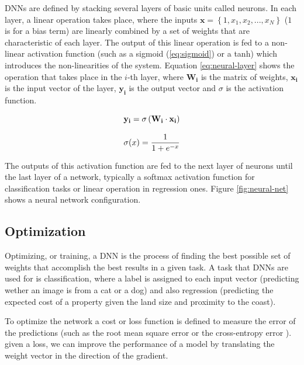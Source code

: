 DNNs are defined by stacking several layers of basic units called neurons. In each layer, a linear operation takes place, where the inputs $\mathbf{x}= \left \{ 1, x_1, x_2, ..., x_N \right \}$ ($1$ is for a bias term) are linearly combined by a set of weights that are characteristic of each layer. The output of this linear operation is fed to a non-linear activation function (such as a sigmoid (\eqref{eq:sigmoid}) or a tanh) which introduces the non-linearities of the system. Equation \eqref{eq:neural-layer} shows the operation that takes place in the $i$-th layer, where $\mathbf{W_i}$  is the matrix of weights, $\mathbf{x_i}$ is the input vector of the layer, $\mathbf{y_i}$ is the output vector and $\sigma$ is the activation function.

\begin{equation}
    \centering
    \mathbf{y_i} = \sigma \left ( \mathbf{W_i} \cdot \mathbf{x_i} \right )
    \label{eq:neural-layer}
\end{equation}

\begin{equation}
    \centering
    \sigma (x) = \frac{1}{1 + e^{-x}} 
    \label{eq:sigmoid}
\end{equation}

The outputs of this activation function are fed to the next layer of neurons until the last layer of a network, typically a softmax activation function for classification tasks or linear operation in regression ones. Figure \ref{fig:neural-net} shows a neural network configuration.

\subsection{Optimization}

Optimizing, or training, a DNN is the process of finding the best possible set of weights that accomplish the best results in a given task. A task that DNNs are used for is classification, where a label is assigned to each input vector (predicting wether an image is from a cat or a dog) and also regression (predicting the expected cost of a property given the land size and proximity to the coast).

To optimize the network a cost or loss function is defined to measure the error of the predictions (such as the root mean square error or the cross-entropy error \cite{golik2013cross}). given a loss, we can improve the performance of a model by translating the weight vector in the direction of the gradient.

